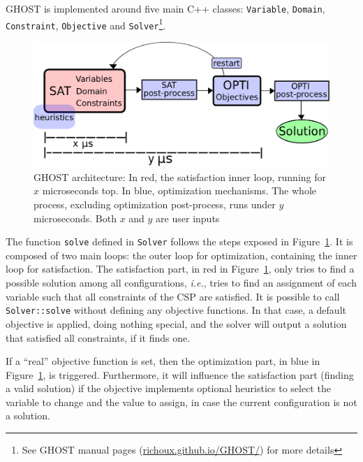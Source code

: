 \documentclass[journal]{IEEEtran}
\newcommand{\minormod}[1]{\color{red} #1\color{black} \xspace}
\newcommand{\csp}{\textsc{CSP}\xspace}
\newcommand{\ghost}{\textsc{GHOST}\xspace}
\newcommand{\ie}{\textit{i.e.}}
\begin{document}
\ghost is implemented around five main C++ classes: \texttt{Variable},
\texttt{Domain},    \texttt{Constraint},     \texttt{Objective}    and
\texttt{Solver}\footnote{See        \ghost         manual        pages
  (\href{http://richoux.github.io/GHOST/}{richoux.github.io/GHOST/})
  for more  details}. %
\begin{figure}[th]
  \centering
  \includegraphics[width=\columnwidth]{figs/archi4.png}
  \caption{\ghost architecture:  In red, the satisfaction  inner loop,
    running  for   $x$  microseconds   top.   In   blue,  optimization
    mechanisms.    The    whole   process,    excluding   optimization
    post-process, runs under $y$ microseconds. \minormod{Both $x$ and $y$ are user inputs}}
  \label{fig:archi}
\end{figure}

The  function \texttt{solve}  defined in  \texttt{Solver} follows  the
steps exposed  in Figure~\ref{fig:archi}. It  is composed of  two main
loops: the outer loop for  optimization, containing the inner loop for
satisfaction.       The     satisfaction     part,    in     red     in
Figure~\ref{fig:archi}, only  tries to find a  possible solution among
all configurations, \ie, tries to  find an assignment of each variable
such that all constraints of the \csp are satisfied. It is possible to
call \texttt{Solver::solve} without  defining any objective functions.
In that case,  a default objective is applied,  doing nothing special,
and the solver will output  a solution that satisfied all constraints,
if it finds one.

If a ``real'' objective function  is set, then the optimization part,
in blue  in Figure~\ref{fig:archi}, is  triggered. Furthermore,  it will
influence  the satisfaction  part (finding  a valid  solution) if  the
objective  implements optional  heuristics to  select the  variable to
change and the value to assign,  in case the current configuration is not a
solution.
\end{document}

